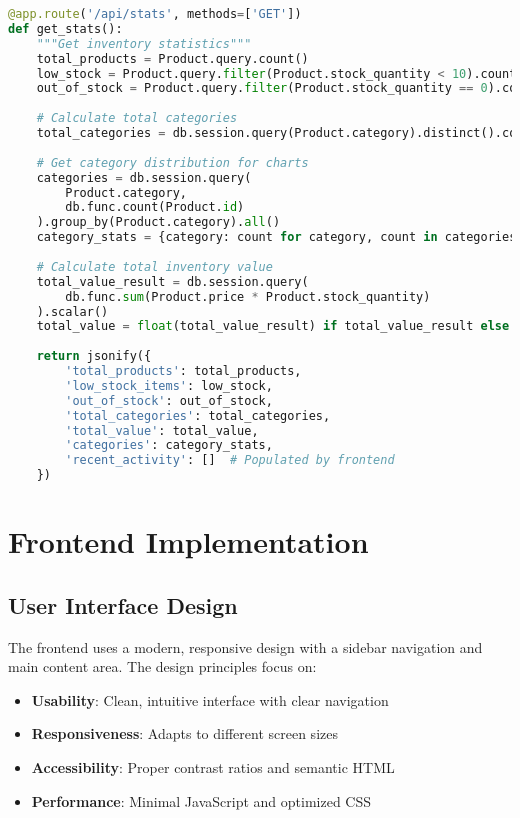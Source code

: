 \documentclass[12pt,a4paper]{article}
\begin{document}
\begin{lstlisting}[language=Python, caption=Statistics Calculation]
@app.route('/api/stats', methods=['GET'])
def get_stats():
    """Get inventory statistics"""
    total_products = Product.query.count()
    low_stock = Product.query.filter(Product.stock_quantity < 10).count()
    out_of_stock = Product.query.filter(Product.stock_quantity == 0).count()
    
    # Calculate total categories
    total_categories = db.session.query(Product.category).distinct().count()
    
    # Get category distribution for charts
    categories = db.session.query(
        Product.category, 
        db.func.count(Product.id)
    ).group_by(Product.category).all()
    category_stats = {category: count for category, count in categories}
    
    # Calculate total inventory value
    total_value_result = db.session.query(
        db.func.sum(Product.price * Product.stock_quantity)
    ).scalar()
    total_value = float(total_value_result) if total_value_result else 0
    
    return jsonify({
        'total_products': total_products,
        'low_stock_items': low_stock,
        'out_of_stock': out_of_stock,
        'total_categories': total_categories,
        'total_value': total_value,
        'categories': category_stats,
        'recent_activity': []  # Populated by frontend
    })
\end{lstlisting}

\section{Frontend Implementation}

\subsection{User Interface Design}

The frontend uses a modern, responsive design with a sidebar navigation and main content area. The design principles focus on:

\begin{itemize}
    \item \textbf{Usability}: Clean, intuitive interface with clear navigation
    \item \textbf{Responsiveness}: Adapts to different screen sizes
    \item \textbf{Accessibility}: Proper contrast ratios and semantic HTML
    \item \textbf{Performance}: Minimal JavaScript and optimized CSS
\end{itemize}
\end{document}
